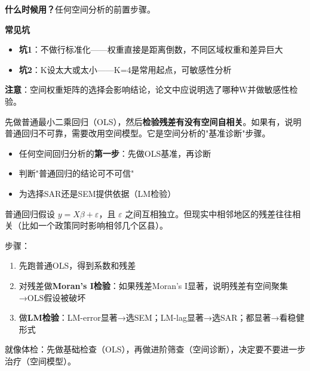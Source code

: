 \begin{algonotes}
\textbf{什么时候用？}任何空间分析的前置步骤。

\textbf{常见坑}
\begin{itemize}
    \item \textbf{坑1}：不做行标准化——权重直接是距离倒数，不同区域权重和差异巨大
    \item \textbf{坑2}：K设太大或太小——K=4是常用起点，可敏感性分析
\end{itemize}

\textbf{注意}：空间权重矩阵的选择会影响结论，论文中应说明选了哪种W并做敏感性检验。
\end{algonotes}


\begin{algointro}
先做普通最小二乘回归（OLS），然后\textbf{检验残差有没有空间自相关}。如果有，说明普通回归不可靠，需要改用空间模型。它是空间分析的"基准诊断"步骤。
\end{algointro}

\begin{algoscene}
\begin{itemize}
    \item 任何空间回归分析的\textbf{第一步}：先做OLS基准，再诊断
    \item 判断"普通回归的结论可不可信"
    \item 为选择SAR还是SEM提供依据（LM检验）
\end{itemize}
\end{algoscene}

\begin{algoprinciple}
普通回归假设 $y = X\beta + \varepsilon$，且 $\varepsilon$ 之间互相独立。但现实中相邻地区的残差往往相关（比如一个政策同时影响相邻几个区县）。

步骤：
\begin{enumerate}
    \item 先跑普通OLS，得到系数和残差
    \item 对残差做\textbf{Moran's I检验}：如果残差Moran's I显著，说明残差有空间聚集→OLS假设被破坏
    \item 做\textbf{LM检验}：LM-error显著→选SEM；LM-lag显著→选SAR；都显著→看稳健形式
\end{enumerate}

就像体检：先做基础检查（OLS），再做进阶筛查（空间诊断），决定要不要进一步治疗（空间模型）。
\end{algoprinciple}

